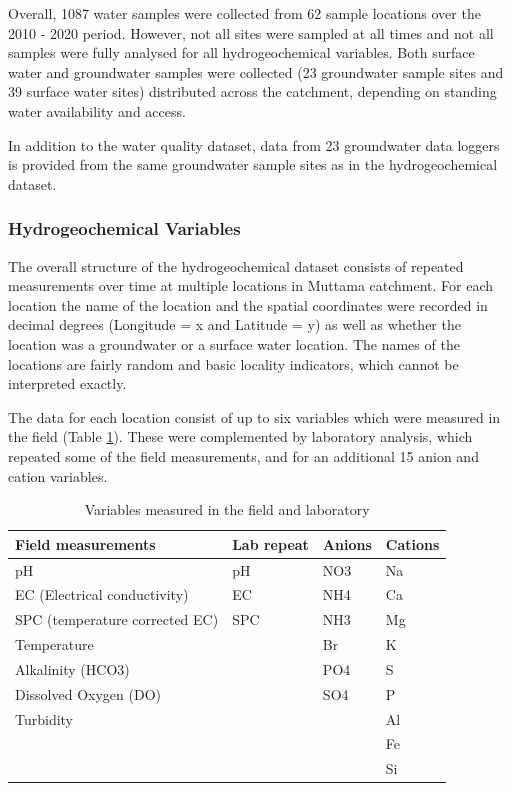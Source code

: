 \documentclass[, manuscript]{copernicus}
\begin{document}
Overall, 1087 water samples were collected from 62 sample locations over
the 2010 - 2020 period. However, not all sites were sampled at all times
and not all samples were fully analysed for all hydrogeochemical
variables. Both surface water and groundwater samples were collected (23
groundwater sample sites and 39 surface water sites) distributed across
the catchment, depending on standing water availability and access.

In addition to the water quality dataset, data from 23 groundwater data
loggers is provided from the same groundwater sample sites as in the
hydrogeochemical dataset.

\subsubsection{Hydrogeochemical Variables}

The overall structure of the hydrogeochemical dataset consists of
repeated measurements over time at multiple locations in Muttama
catchment. For each location the name of the location and the spatial
coordinates were recorded in decimal degrees (Longitude = x and Latitude
= y) as well as whether the location was a groundwater or a surface
water location. The names of the locations are fairly random and basic
locality indicators, which cannot be interpreted exactly.

The data for each location consist of up to six variables which were
measured in the field (Table \ref{tab:TableMeasurements}). These were
complemented by laboratory analysis, which repeated some of the field
measurements, and for an additional 15 anion and cation variables.

\clearpage

\begin{table}
\centering
\caption{\label{tab:TableMeasurements}Variables measured in the field and laboratory}
\centering
\begin{tabular}[t]{l|l|l|l}
\hline
Field measurements & Lab repeat & Anions & Cations\\
\hline
pH & pH & NO3 & Na\\
\hline
EC (Electrical conductivity) & EC & NH4 & Ca\\
\hline
SPC (temperature corrected EC) & SPC & NH3 & Mg\\
\hline
Temperature &  & Br & K\\
\hline
Alkalinity (HCO3) &  & PO4 & S\\
\hline
Dissolved Oxygen (DO) &  & SO4 & P\\
\hline
Turbidity &  &  & Al\\
\hline
 &  &  & Fe\\
\hline
 &  &  & Si\\
\hline
\end{tabular}
\end{table}
\end{document}
